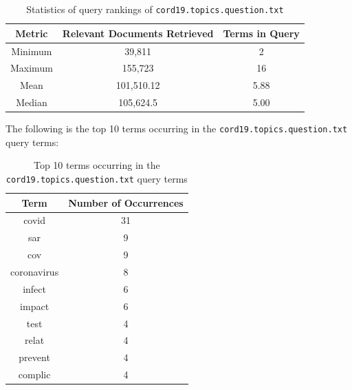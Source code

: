 \documentclass[11pt]{article}
\begin{document}
\begin{table}[!ht]
    \caption{Statistics of query rankings of \texttt{cord19.topics.question.txt}}
    \begin{center}

        \begin{tabular}{| c | c | c |}
        \hline
        \textbf{Metric} & \textbf{Relevant Documents Retrieved} & \textbf{Terms in Query}
        \\ \hline
        Minimum & 39,811 & 2
        \\ \hline
        Maximum & 155,723 & 16
        \\ \hline
        Mean & 101,510.12 & 5.88
        \\ \hline
        Median & 105,624.5 & 5.00
        \\ \hline
        \end{tabular}

    \end{center}

\end{table}

The following is the top 10 terms occurring in the  \texttt{cord19.topics.question.txt} query terms:

\begin{table}[!ht]
    \caption{Top 10 terms occurring in the \texttt{cord19.topics.question.txt} query terms}
    \begin{center}

        \begin{tabular}{| c | c |}
        \hline
        \textbf{Term} & \textbf{Number of Occurrences}
        \\ \hline
        covid & 31
        \\ \hline
        sar & 9
        \\ \hline
        cov & 9
        \\ \hline
        coronavirus & 8
        \\ \hline
        infect & 6
        \\ \hline
        impact & 6
        \\ \hline
        test & 4
        \\ \hline
        relat & 4
        \\ \hline
        prevent & 4
        \\ \hline
        complic & 4
        \\ \hline
        \end{tabular}

    \end{center}

\end{table}
\end{document}
